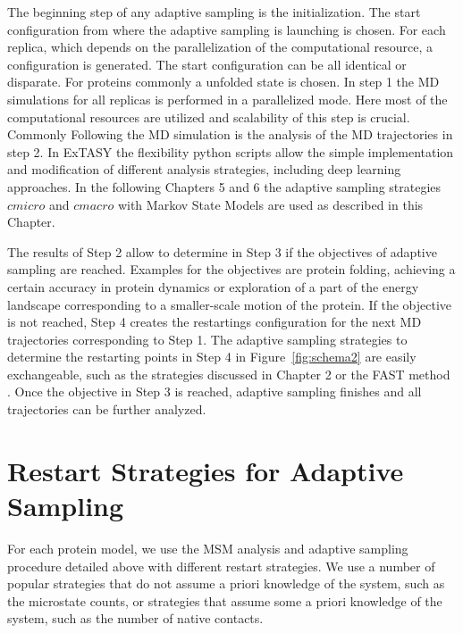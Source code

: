 The beginning step of any adaptive sampling is the initialization. The start configuration from where the adaptive sampling is launching is chosen. For each replica, which depends on the parallelization of the computational resource, a configuration is generated. The start configuration can be all identical or disparate. For proteins commonly a unfolded state is chosen.
In step 1 the MD simulations for all replicas is performed in a parallelized mode. Here most of the computational resources are utilized and scalability of this step is crucial. Commonly  
Following the MD simulation is the analysis of the MD trajectories in step 2. In ExTASY the flexibility python scripts allow the simple implementation and modification of different analysis strategies, including deep learning approaches\cite{Mardt2018}. In the following Chapters 5 and 6 the adaptive sampling strategies $cmicro$ and $cmacro$ with Markov State Models \cite{prinz2011markov} are used as described in this Chapter. 

The results of Step 2 allow to determine in Step 3 if the objectives of adaptive sampling are reached. Examples for the objectives are protein folding, achieving a certain accuracy in protein dynamics or exploration of a part of the energy landscape corresponding to a smaller-scale motion of the protein. If the objective is not reached, Step 4 creates the restartings configuration for the next MD trajectories corresponding to Step 1. The adaptive sampling strategies to determine the restarting points in Step 4 in Figure~\ref{fig:schema2} are easily exchangeable, such as the strategies discussed in Chapter 2 or the FAST method \cite{FAST}. Once the objective in Step 3 is reached, adaptive sampling finishes and all trajectories can be further analyzed. 




\section{\label{sec:restart-strategies}Restart Strategies for Adaptive Sampling}

For each protein model, we use the MSM analysis and adaptive sampling procedure detailed
above with different restart strategies. We use a number of popular
strategies that do not assume a priori knowledge of the system, such as the microstate counts, or strategies that assume some a
priori knowledge of the system, such as the number of native contacts. 



